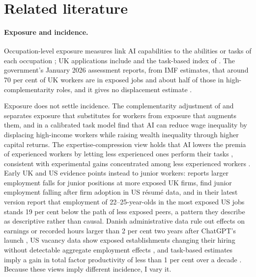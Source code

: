 \section{Related literature}
\label{sec:literature}

\paragraph{Exposure and incidence.} Occupation-level exposure measures link AI capabilities to the abilities or tasks of each occupation \citep{webb2019, felten2021, tolan2021, eloundou2023, gmyrek2023, ilo2025}; UK applications include \citet{dsit2023} and the task-based index of \citet{henseke2025}. The government's January 2026 assessment reports, from IMF estimates, that around 70 per cent of UK workers are in exposed jobs and about half of those in high-complementarity roles, and it gives no displacement estimate \citep{govuk2026}.

Exposure does not settle incidence. The complementarity adjustment of \citet{pizzinelli2023} and \citet{cazzaniga2024} separates exposure that substitutes for workers from exposure that augments them, and in a calibrated task model \citet{rockall2025} find that AI can reduce wage inequality by displacing high-income workers while raising wealth inequality through higher capital returns. The expertise-compression view holds that AI lowers the premia of experienced workers by letting less experienced ones perform their tasks \citep{autor2024, hosseinilichtinger2026barriers}, consistent with experimental gains concentrated among less experienced workers \citep{noy2023, brynjolfsson2025qje}. Early UK and US evidence points instead to junior workers: \citet{kleinteeselink2025} reports larger employment falls for junior positions at more exposed UK firms, \citet{hosseini2026} find junior employment falling after firm adoption in US r\'esum\'e data, and in their latest version \citet{brynjolfsson2025} report that employment of 22--25-year-olds in the most exposed US jobs stands 19 per cent below the path of less exposed peers, a pattern they describe as descriptive rather than causal. Danish administrative data rule out effects on earnings or recorded hours larger than 2 per cent two years after ChatGPT's launch \citep{humlum2025}, US vacancy data show exposed establishments changing their hiring without detectable aggregate employment effects \citep{acemoglu2022vacancies}, and task-based estimates imply a gain in total factor productivity of less than 1 per cent over a decade \citep{acemoglu2025}. Because these views imply different incidence, I vary it.

